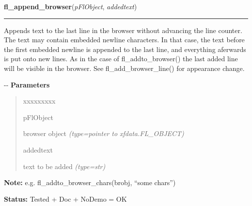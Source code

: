 \hspace{.8\funcindent}\begin{boxedminipage}{\funcwidth}

    \raggedright \textbf{fl\_append\_browser}(\textit{pFlObject}, \textit{addedtext})

    \vspace{-1.5ex}

    \rule{\textwidth}{0.5\fboxrule}
\setlength{\parskip}{2ex}

Appends text to the last line in the browser without advancing the
line counter. The text may contain embedded newline characters. In that
case, the text before the first embedded newline is appended to the last
line, and everything aferwards is put onto new lines. As in the case of
fl\_addto\_browser() the last added line will be visible in the browser.
See fl\_add\_browser\_line() for appearance change.

-{}-
\setlength{\parskip}{1ex}
      \textbf{Parameters}
      \vspace{-1ex}

      \begin{quote}
        \begin{Ventry}{xxxxxxxxx}

          \item[pFlObject]


browser object
            {\it (type=pointer to xfdata.FL\_OBJECT)}

          \item[addedtext]


text to be added
            {\it (type=str)}

        \end{Ventry}

      \end{quote}

\textbf{Note:} 
e.g. fl\_addto\_browser\_chars(brobj, ``some chars'')


\textbf{Status:} 
Tested + Doc + NoDemo = OK


    \end{boxedminipage}

    \label{xformslib:flbrowser:fl_insert_browser_line}

    \vspace{0.5ex}

